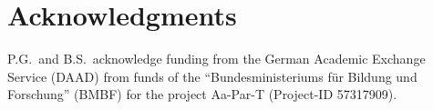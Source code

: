 \documentclass[aip,jcp,a4paper,11pt]{revtex4-1}
\begin{document}

%






\section*{Acknowledgments}
P.G.~and B.S.~acknowledge funding from the German Academic Exchange Service (DAAD) from funds of the ``Bundesministeriums f\"ur Bildung und Forschung'' (BMBF) for the project Aa-Par-T (Project-ID 57317909).
\appendix




%



\end{document}
